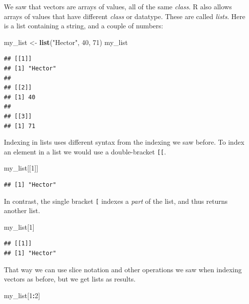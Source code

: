 \documentclass[12pt,]{book}
\newenvironment{Shaded}{\begin{snugshade}}{\end{snugshade}}
\newcommand{\KeywordTok}[1]{\textcolor[rgb]{0.13,0.29,0.53}{\textbf{#1}}}
\newcommand{\DecValTok}[1]{\textcolor[rgb]{0.00,0.00,0.81}{#1}}
\newcommand{\StringTok}[1]{\textcolor[rgb]{0.31,0.60,0.02}{#1}}
\newcommand{\OperatorTok}[1]{\textcolor[rgb]{0.81,0.36,0.00}{\textbf{#1}}}
\newcommand{\NormalTok}[1]{#1}
\theoremstyle{definition}
\theoremstyle{definition}
\theoremstyle{remark}
\begin{document}
We saw that vectors are arrays of values, all of the same \emph{class}.
R also allows arrays of values that have different \emph{class} or
datatype. These are called \emph{lists}. Here is a list containing a
string, and a couple of numbers:

\begin{Shaded}
\begin{Highlighting}[]
\NormalTok{my_list <-}\StringTok{ }\KeywordTok{list}\NormalTok{(}\StringTok{"Hector"}\NormalTok{, }\DecValTok{40}\NormalTok{, }\DecValTok{71}\NormalTok{)}
\NormalTok{my_list}
\end{Highlighting}
\end{Shaded}

\begin{verbatim}
## [[1]]
## [1] "Hector"
## 
## [[2]]
## [1] 40
## 
## [[3]]
## [1] 71
\end{verbatim}

Indexing in lists uses different syntax from the indexing we saw before.
To index an element in a list we would use a double-bracket
\texttt{{[}{[}}.

\begin{Shaded}
\begin{Highlighting}[]
\NormalTok{my_list[[}\DecValTok{1}\NormalTok{]]}
\end{Highlighting}
\end{Shaded}

\begin{verbatim}
## [1] "Hector"
\end{verbatim}

In contrast, the single bracket \texttt{{[}} indexes a \emph{part} of
the list, and thus returns another list.

\begin{Shaded}
\begin{Highlighting}[]
\NormalTok{my_list[}\DecValTok{1}\NormalTok{]}
\end{Highlighting}
\end{Shaded}

\begin{verbatim}
## [[1]]
## [1] "Hector"
\end{verbatim}

That way we can use slice notation and other operations we saw when
indexing vectors as before, but we get lists as results.

\begin{Shaded}
\begin{Highlighting}[]
\NormalTok{my_list[}\DecValTok{1}\OperatorTok{:}\DecValTok{2}\NormalTok{]}
\end{Highlighting}
\end{Shaded}
\end{document}

